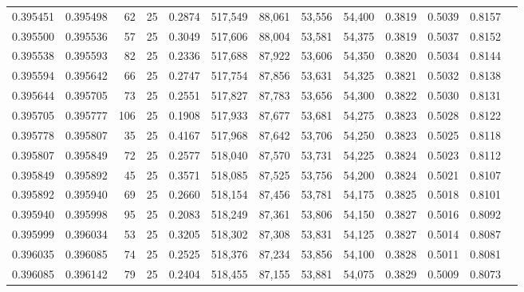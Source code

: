 \begin{tabular}{rrrrrrrrrrrrr}
0.395451 & 0.395498 &    62 &  25 &                                     0.2874 & 517,549 &  88,061 &  53,556 &  54,400 & 0.3819 & 0.5039 & 0.8157 \\
0.395500 & 0.395536 &    57 &  25 &                                     0.3049 & 517,606 &  88,004 &  53,581 &  54,375 & 0.3819 & 0.5037 & 0.8152 \\
0.395538 & 0.395593 &    82 &  25 &                                     0.2336 & 517,688 &  87,922 &  53,606 &  54,350 & 0.3820 & 0.5034 & 0.8144 \\
0.395594 & 0.395642 &    66 &  25 &                                     0.2747 & 517,754 &  87,856 &  53,631 &  54,325 & 0.3821 & 0.5032 & 0.8138 \\
0.395644 & 0.395705 &    73 &  25 &                                     0.2551 & 517,827 &  87,783 &  53,656 &  54,300 & 0.3822 & 0.5030 & 0.8131 \\
0.395705 & 0.395777 &   106 &  25 &                                     0.1908 & 517,933 &  87,677 &  53,681 &  54,275 & 0.3823 & 0.5028 & 0.8122 \\
0.395778 & 0.395807 &    35 &  25 &                                     0.4167 & 517,968 &  87,642 &  53,706 &  54,250 & 0.3823 & 0.5025 & 0.8118 \\
0.395807 & 0.395849 &    72 &  25 &                                     0.2577 & 518,040 &  87,570 &  53,731 &  54,225 & 0.3824 & 0.5023 & 0.8112 \\
0.395849 & 0.395892 &    45 &  25 &                                     0.3571 & 518,085 &  87,525 &  53,756 &  54,200 & 0.3824 & 0.5021 & 0.8107 \\
0.395892 & 0.395940 &    69 &  25 &                                     0.2660 & 518,154 &  87,456 &  53,781 &  54,175 & 0.3825 & 0.5018 & 0.8101 \\
0.395940 & 0.395998 &    95 &  25 &                                     0.2083 & 518,249 &  87,361 &  53,806 &  54,150 & 0.3827 & 0.5016 & 0.8092 \\
0.395999 & 0.396034 &    53 &  25 &                                     0.3205 & 518,302 &  87,308 &  53,831 &  54,125 & 0.3827 & 0.5014 & 0.8087 \\
0.396035 & 0.396085 &    74 &  25 &                                     0.2525 & 518,376 &  87,234 &  53,856 &  54,100 & 0.3828 & 0.5011 & 0.8081 \\
0.396085 & 0.396142 &    79 &  25 &                                     0.2404 & 518,455 &  87,155 &  53,881 &  54,075 & 0.3829 & 0.5009 & 0.8073 \\

\end{tabular}
